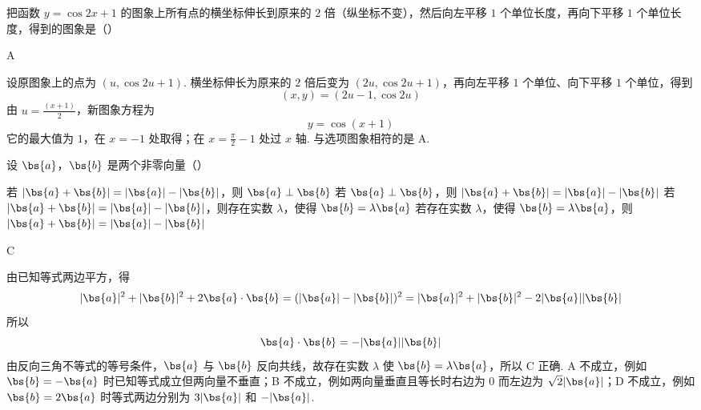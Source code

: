 \begin{problem}
把函数 \(y = \cos 2x + 1\) 的图象上所有点的横坐标伸长到原来的 \(2\) 倍（纵坐标不变），然后向左平移 \(1\) 个单位长度，再向下平移 \(1\) 个单位长度，得到的图象是（\quad）

    {}
    {}
    {}
\end{problem}

\begin{answer}
A
\end{answer}

\begin{solution}
设原图象上的点为 \((u,\cos2u+1)\). 横坐标伸长为原来的 \(2\) 倍后变为 \((2u,\cos2u+1)\)，再向左平移 \(1\) 个单位、向下平移 \(1\) 个单位，得到
\[
(x,y)=(2u-1,\cos2u)
\]
由 \(u=\frac{(x+1)}{2}\)，新图象方程为
\[
y=\cos(x+1)
\]
它的最大值为 \(1\)，在 \(x=-1\) 处取得；在 \(x=\frac{\pi}{2}-1\) 处过 \(x\) 轴. 与选项图象相符的是 A.
\end{solution}

\begin{problem}
设 \(\bs{a}\)，\(\bs{b}\) 是两个非零向量（\quad）

\choices
    {若 \(|\bs{a} + \bs{b}| = |\bs{a}| - |\bs{b}|\)，则 \(\bs{a} \perp \bs{b}\)}
    {若 \(\bs{a} \perp \bs{b}\)，则 \(|\bs{a} + \bs{b}| = |\bs{a}| - |\bs{b}|\)}
    {若 \(|\bs{a} + \bs{b}| = |\bs{a}| - |\bs{b}|\)，则存在实数 \(\lambda\)，使得 \(\bs{b} = \lambda \bs{a}\)}
    {若存在实数 \(\lambda\)，使得 \(\bs{b} = \lambda \bs{a}\)，则 \(|\bs{a} + \bs{b}| = |\bs{a}| - |\bs{b}|\)}
\end{problem}

\begin{answer}
C
\end{answer}

\begin{solution}
由已知等式两边平方，得
\[
|\bs{a}|^{2}+|\bs{b}|^{2}+2\bs{a}\cdot\bs{b}
=(|\bs{a}|-|\bs{b}|)^{2}
=|\bs{a}|^{2}+|\bs{b}|^{2}-2|\bs{a}||\bs{b}|
\]
所以
\[
\bs{a}\cdot\bs{b}=-|\bs{a}||\bs{b}|
\]
由反向三角不等式的等号条件，\(\bs{a}\) 与 \(\bs{b}\) 反向共线，故存在实数 \(\lambda\) 使 \(\bs{b}=\lambda\bs{a}\)，所以 C 正确. A 不成立，例如 \(\bs{b}=-\bs{a}\) 时已知等式成立但两向量不垂直；B 不成立，例如两向量垂直且等长时右边为 \(0\) 而左边为 \(\sqrt2|\bs{a}|\)；D 不成立，例如 \(\bs{b}=2\bs{a}\) 时等式两边分别为 \(3|\bs{a}|\) 和 \(-|\bs{a}|\).
\end{solution}

